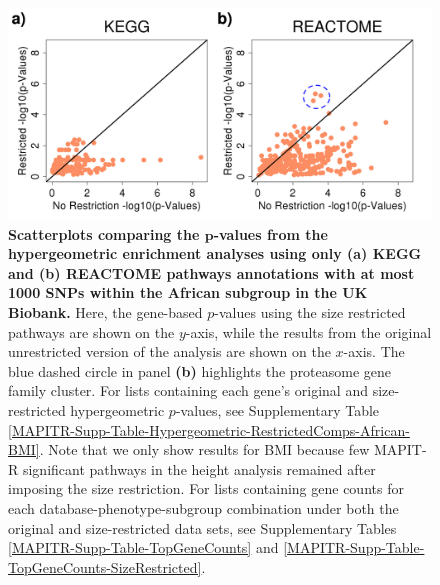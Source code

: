 \documentclass[10pt]{article}
\begin{document}
\begin{figure}[htb]
\centering
\includegraphics[width=\textwidth]{Images/Main/Figure4.png}
\caption{\textbf{Scatterplots comparing the $\bm{p}$-values from the hypergeometric enrichment analyses using only (a) KEGG and (b) REACTOME pathways annotations with at most 1000 SNPs within the African subgroup in the UK Biobank.} Here, the gene-based $p$-values using the size restricted pathways are shown on the $y$-axis, while the results from the original unrestricted version of the analysis are shown on the $x$-axis. The blue dashed circle in panel \textbf{(b)} highlights the proteasome gene family cluster. For lists containing each gene's original and size-restricted hypergeometric $p$-values, see Supplementary Table \ref{MAPITR-Supp-Table-Hypergeometric-RestrictedComps-African-BMI}. Note that we only show results for BMI because few MAPIT-R significant pathways in the height analysis remained after imposing the size restriction. For lists containing gene counts for each database-phenotype-subgroup combination under both the original and size-restricted data sets, see Supplementary Tables \ref{MAPITR-Supp-Table-TopGeneCounts} and \ref{MAPITR-Supp-Table-TopGeneCounts-SizeRestricted}.}
\label{MAPITR-Main-Figure-Hypergeometric-RestrictedComps-African-BMI}
\end{figure}

\end{document}
